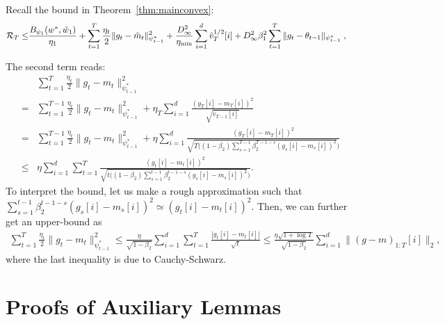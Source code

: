 \documentclass[11pt]{article}
\makeatletter
\renewenvironment{proof}[1][\proofname]{%
   \par\pushQED{\qed}\normalfont%
   \topsep6\p@\@plus6\p@\relax
   \trivlist\item[\hskip\labelsep\bfseries#1]%
   \ignorespaces
}{%
   \popQED\endtrivlist\@endpefalse
}
\theoremstyle{k}
\makeatother
\begin{document}
\begin{proof}
Recall the bound in Theorem~\ref{thm:mainconvex}:
\begin{equation}\notag
\begin{aligned}
\mathcal{R}_T \leq &   \frac{ B_{\psi_1}(w^*, \tilde{w}_{1})}{\eta_1}
+ \sum_{t=1}^T\frac{\eta_t}{2} \| g_t - \tilde{m}_t  \|_{\psi_{t-1}^*}^2  + \frac{D_{\infty}^2}{\eta_{\min}}  \sum_{i=1}^d \hat{v}_{T}^{1/2}[i] + D_{\infty}^2\beta_1^2   \sum_{t=1}^T  \| g_t - \theta_{t-1}  \|_{\psi_{t-1}^*}\;,
\end{aligned}
\end{equation}

The second term reads:
\begin{align*}
     &\sum_{t=1}^T \frac{\eta_t}{2} \|g_t - m_t  \|_{\psi_{t-1}^*}^2 \\
      =&\sum_{t=1}^{T-1} \frac{\eta_t}{2} \|g_t - m_t  \|_{\psi_{t-1}^*}^2   + \eta_T \sum_{i=1}^d \frac{ (g_{T}[i] - m_{T}[i])^2 }{ \sqrt{ v_{T-1}[i]} }\\
=&\sum_{t=1}^{T-1} \frac{\eta_t}{2} \|g_t - m_t  \|_{\psi_{t-1}^*}^2 + \eta \sum_{i=1}^d \frac{ (g_{T}[i] - m_{T}[i])^2 }{ \sqrt{ T \big( (1-\beta_2) \sum_{s=1}^{T-1} \beta_2^{T-1-s} (g_{s}[i] - m_{s}[i])^2 } \big) }\\
\leq &  \eta \sum_{i=1}^d \sum_{t=1}^T \frac{ (g_{t}[i] - m_{t}[i])^2 }{ \sqrt{ t \big( (1-\beta_2) \sum_{s=1}^{t-1} \beta_2^{t-1-s} (g_{s}[i] - m_{s}[i])^2 } \big) }.
\end{align*}
To interpret the bound, let us make a rough approximation such that
$\sum_{s=1}^{t-1} \beta_2^{t-1-s} (g_{s}[i] - m_{s}[i])^2  \simeq (g_{t}[i] - m_t[i])^2 $.
Then, we can further get an upper-bound as 
\begin{align*}
    \sum_{t=1}^T \frac{\eta_t}{2} \|g_t - m_t  \|_{\psi_{t-1}^*}^2 \leq
    \frac{\eta}{\sqrt{1 - \beta_2}} \sum_{i=1}^d \sum_{t=1}^{T} \frac{ | g_{t}[i] - m_{t}[i] | }{ \sqrt{t} }\leq \frac{\eta \sqrt{1 + \log T}}{\sqrt{1 - \beta_2}} \sum_{i=1}^d \| (g-m)_{1:T}[i] \|_2 ,
\end{align*}
where the last inequality is due to Cauchy-Schwarz.


\end{proof}

\clearpage
\section{Proofs of Auxiliary Lemmas}
\end{document}
